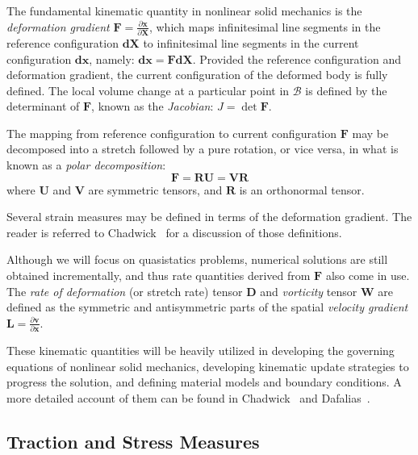 The fundamental kinematic quantity in nonlinear solid mechanics is the \textit{deformation gradient} $\bm{F} = \frac{\partial \bm{x}}{\partial \bm{X}}$, which maps infinitesimal line segments in the reference configuration $\bm{dX}$ to infinitesimal line segments in the current configuration $\bm{dx}$, namely: $\bm{dx} = \bm{F}\bm{dX}$. Provided the reference configuration and deformation gradient, the current configuration of the deformed body is fully defined. The local volume change at a particular point in $\mathcal{B}$ is defined by the determinant of $\bm{F}$, known as the \textit{Jacobian}: $J = \det{\bm{F}}$.

The mapping from reference configuration to current configuration $\bm{F}$ may be decomposed into a  stretch followed by a pure rotation, or vice versa, in what is known as a \textit{polar decomposition}:
\begin{equation}
\bm{F} = \bm{R}\bm{U} = \bm{V}\bm{R}
\end{equation}
where $\bm{U}$ and $\bm{V}$ are symmetric tensors, and $\bm{R}$ is an orthonormal tensor.

Several strain measures may be defined in terms of the deformation gradient. The reader is referred to Chadwick~\cite{chadwick_1999} for a discussion of those definitions.

Although we will focus on quasistatics problems, numerical solutions are still obtained incrementally, and thus rate quantities derived from $\bm{F}$ also come in use. The \textit{rate of deformation} (or stretch rate) tensor $\bm{D}$ and \textit{vorticity} tensor $\bm{W}$ are defined as the symmetric and antisymmetric parts of the spatial \textit{velocity gradient} $\bm{L} = \frac{\partial \bm{v}}{\partial \bm{x}}$.

These kinematic quantities will be heavily utilized in developing the governing equations of nonlinear solid mechanics, developing kinematic update strategies to progress the solution, and defining material models and boundary conditions. A more detailed account of them can be found in Chadwick~\cite{chadwick_1999} and Dafalias~\cite{dafalias_205}.

\subsection{Traction and Stress Measures}

